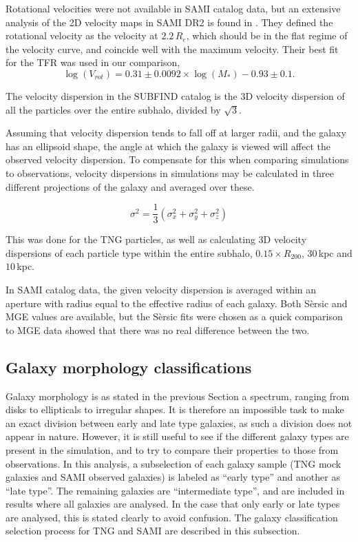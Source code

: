 Rotational velocities were not available in SAMI catalog data, but an extensive analysis of the 2D velocity maps in SAMI DR2 is found in \textcite{Bloom2017}. They defined the rotational velocity as the velocity at $2.2\, R_e$, which should be in the flat regime of the velocity curve, and coincide well with the maximum velocity. Their best fit for the TFR was used in our comparison, 
\begin{equation}
	\log(V_{rot}) = 0.31 \pm 0.0092 \times \log(M_*)-0.93 \pm 0.1.
\end{equation}

The velocity dispersion in the SUBFIND catalog is the 3D velocity dispersion of all the particles over the entire subhalo, divided by $\sqrt{3}$. %

Assuming that velocity dispersion tends to fall off at larger radii, and the galaxy has an ellipsoid shape, the angle at which the galaxy is viewed will affect the observed velocity dispersion. To compensate for this when comparing simulations to observations, velocity dispersions in simulations may be calculated in three different projections of the galaxy and averaged over these. 

\begin{equation} \label{sigma1}
    \sigma^{2} = \frac{1}{3}(\sigma_x^2 + \sigma_y^2 + \sigma_z^2)
\end{equation}

This was done for the TNG particles, as well as calculating 3D velocity dispersions of each particle type within the entire subhalo, $0.15 \times R_{200}$, $30\,$kpc and $10\,$kpc.

In SAMI catalog data, the given velocity dispersion is averaged within an aperture with radius equal to the effective radius of each galaxy. Both Sèrsic and MGE values are available, but the Sèrsic fits were chosen as a quick comparison to MGE data showed that there was no real difference between the two.

\subsection{Galaxy morphology classifications}

Galaxy morphology is as stated in the previous Section a spectrum, ranging from disks to ellipticals to irregular shapes. It is therefore an impossible task to make an exact division between early and late type galaxies, as such a division does not appear in nature. However, it is still useful to see if the different galaxy types are present in the simulation, and to try to compare their properties to those from observations. In this analysis, a subselection of each galaxy sample (TNG mock galaxies and SAMI observed galaxies) is labeled as ``early type'' and another as ``late type''. The remaining galaxies are ``intermediate type'', and are included in results where all galaxies are analysed. In the case that only early or late types are analysed, this is stated clearly to avoid confusion. The galaxy classification selection process for TNG and SAMI are described in this subsection.

